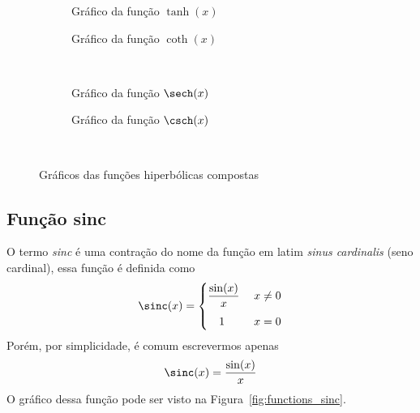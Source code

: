 \begin{figure}
  \centering
  \begin{subfigure}[b]{0.5\linewidth}
    \centering
    
    \caption{Gráfico da função $\tanh(x)$}
    \label{fig:functions_tanh}
  \end{subfigure}%
  \begin{subfigure}[b]{0.5\linewidth}
    \centering
    
    \caption{Gráfico da função $\coth(x)$}
    \label{fig:functions_coth}
  \end{subfigure}\\[0.5\baselineskip]
  \begin{subfigure}[b]{0.5\linewidth}
    \centering
    
    \caption{Gráfico da função $\sech(x)$}
    \label{fig:functions_sech}
  \end{subfigure}%
  \begin{subfigure}[b]{0.5\linewidth}
    \centering
    
    \caption{Gráfico da função $\csch(x)$}
    \label{fig:functions_csch}
  \end{subfigure}\\[0.5\baselineskip]
  \caption{Gráficos das funções hiperbólicas compostas}
  \label{fig:functions_hiper_2}
\end{figure}

\subsection*{Função sinc}

O termo \emph{sinc} é uma contração do nome da função em latim
\textit{sinus cardinalis} (seno cardinal), essa função é definida como
\begin{equation}
  \label{eq:funcao_sinc}
  \sinc(x) = \begin{cases}
                \dfrac{\sin(x)}{x} & \; x \neq 0 \\[3mm]
                \quad 1            & \; x = 0
             \end{cases}
\end{equation}
Porém, por simplicidade, é comum escrevermos apenas
\[
  \sinc(x) = \frac{\sin(x)}{x}
\]
O gráfico dessa função pode ser visto na Figura~\ref{fig:functions_sinc}.

